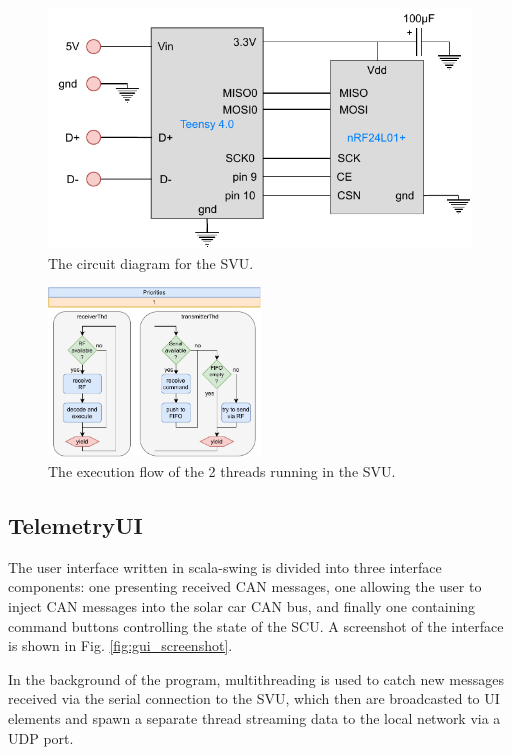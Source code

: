 \documentclass[a4paper,conference]{IEEEtran}
\begin{document}
\begin{figure}[b]
    \centering
    \includegraphics[width=\linewidth]{documentation/images/SVU_CircuitDiagram.pdf}
    \caption{The circuit diagram for the SVU.}
    \label{fig:SVU_circuit}
\end{figure}
\begin{figure}[t]
    \centering
    \includegraphics[height=4.5cm]{documentation/images/SVU_threads.pdf}
    \caption{The execution flow of the 2 threads running in the SVU.}
    \label{fig:SVU_threads}
\end{figure}

\subsection{TelemetryUI}

The user interface written in scala-swing is divided into three interface components: one presenting received CAN messages, one allowing the user to inject CAN messages into the solar car CAN bus, and finally one containing command buttons controlling the state of the SCU. A screenshot of the interface is shown in Fig. \ref{fig:gui_screenshot}.

In the background of the program, multithreading is used to catch new messages received via the serial connection to the SVU, which then are broadcasted to UI elements and spawn a separate thread streaming data to the local network via a UDP port. 
\end{document}
